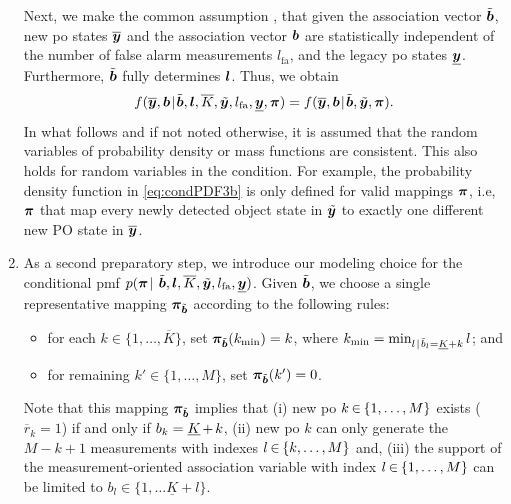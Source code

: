 \documentclass[11pt,a4paper]{article}
\newcommand{\ist}{\hspace*{.3mm}}
\newcommand{\rmv}{\hspace*{-.3mm}}
\newcommand{\ynew}{\overline{\V{y}}}
\newcommand{\Knew}{\overline{K}}
\newcommand{\yt}{\tilde{\V{y}}}
\newcommand{\kmin}{k_{\mathrm{min}}}
\begin{document}
\begin{enumerate}
Next, we make the common assumption \cite{MeyKroWilLauHlaBraWin:J18,GraFatSve:J19}, that given the association vector $\tilde{\bm{b}}$, new \ac{po} states $\overline{\bm{y}}$ and the association vector $\bm{b}$ are statistically independent of the number of false alarm measurements $l_{\mathrm{fa}}$, and the legacy  \ac{po} states $\underline{\bm{y}}$. Furthermore, $\tilde{\bm{b}}$ fully determines $\bm{l}$. Thus, we \vspace{-1mm} obtain
\begin{equation}
f(\overline{\V{y}}, \V{b} \ist | \ist \tilde{\V{b}}, \V{l}, \overline{K}, \tilde{\V{y}}, l_{\mathrm{fa}}, \underline{\V{y}},\V{\pi}) = f(\overline{\V{y}}, \V{b} \ist | \ist \tilde{\V{b}},\tilde{\V{y}},\V{\pi}) .  \label{eq:condPDF3b}
\vspace{-1mm}
\end{equation}
In what follows and if not noted otherwise, it is assumed that the random variables of probability density or mass functions are consistent. This also holds for random variables in the condition. For example, the probability density function in \eqref{eq:condPDF3b} is only defined for valid mappings $\bm{\pi}$, i.e, $\bm{\pi}$ that map every newly detected object state in $\yt$ to exactly one different new PO state in $\ynew$.



\item As a second preparatory step, we introduce our modeling choice for the conditional \ac{pmf} $p( \V{\pi} \ist |$ $\tilde{\bm{b}}, \bm{l}, \overline{K},\tilde{\bm{y}},  l_{\mathrm{fa}}, \underline{\bm{y}})$. Given $\tilde{\bm{b}}$, we choose a single representative mapping $\bm{\pi}_{\tilde{\bm{b}}}$ according to the following \vspace{-2mm} rules:
%
\begin{itemize}
\item for each $k\in\{1,\dots,\Knew\}$, set $\V{\pi}_{\tilde{\V{b}}}(\kmin)=k$, where $\kmin = \min_{l \ist | \ist \tilde{b}_l = \underline{K}+k} l$; and
\item for remaining $k'\in\{1,\dots,M\}$, set $\bm{\pi}_{\tilde{\bm{b}}}(k')=0$.
\end{itemize}
Note that this mapping $\bm{\pi}_{\tilde{\bm{b}}}$ implies that (i) new \ac{po} $k \rmv\in\rmv \{1,\dots,M\}$ exists ($\overline{r}_k = 1$) if and only if $b_{k} = \underline{K} \rmv+\rmv k$, (ii) new \ac{po} $k$ can only generate the $M-k+1$ measurements with indexes $l \rmv\in\rmv \{k,\dots,M\}$ and, (iii) the support of the measurement-oriented association variable with index $l \rmv\in\rmv \{1,\dots,M\}$ can be limited to $b_{l} \in \{1,\dots \underline{K} + l\}$.


\end{enumerate}
\end{document}
